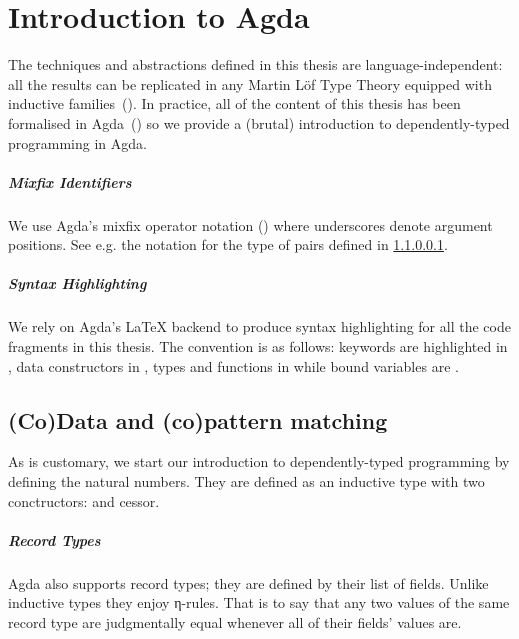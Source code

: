 \chapter{Introduction to Agda}

The techniques and abstractions defined in this thesis are language-independent: all the
results can be replicated in any Martin L\"of Type Theory equipped with inductive
families~(\cite{dybjer1994inductive}). In practice, all of the content of this thesis
has been formalised in Agda~(\cite{norell2009dependently}) so we provide a (brutal)
introduction to dependently-typed programming in Agda.

\paragraph{Mixfix Identifiers} We use Agda's mixfix operator notation
(\cite{danielsson2011parsing}) where underscores denote argument positions.
See e.g. the notation  for the type of pairs defined in \cref{par:recordtypes}.


\paragraph{Syntax Highlighting} We rely on Agda's \LaTeX{} backend to produce
syntax highlighting for all the code fragments in this thesis. The convention
is as follows: keywords are highlighted in , data constructors in
, types and functions in  while bound variables are .


\section{(Co)Data and (co)pattern matching}

As is customary, we start our introduction to dependently-typed programming by
defining the natural numbers. They are defined as an inductive type with two
conctructors:  and cessor.


\paragraph{Record Types}\label{par:recordtypes}

Agda also supports record types; they are defined by their list of fields.
Unlike inductive types they enjoy η-rules. That is to say that any two
values of the same record type are judgmentally equal whenever all of their
fields' values are.

